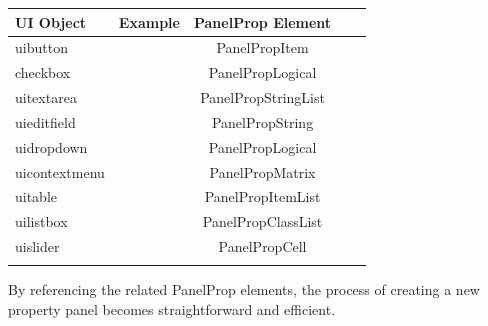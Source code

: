 \documentclass{tufte-handout}
\begin{document}
\begin{table}\sffamily
	\begin{tabular}{l*4{C}@{}}
		\toprule
		UI Object & Example & PanelProp Element \\ 
		\midrule
		uibutton & \addpicbutton & PanelPropItem \\ 
		checkbox & \addpiccheckbox & PanelPropLogical \\ 
		uitextarea  & \addpictextarea & PanelPropStringList \\
		uieditfield & \addpiceditfield & PanelPropString \\
		uidropdown & \addpicdropdown & PanelPropLogical \\
		uicontextmenu & \addpiccontextmenu & PanelPropMatrix \\
		uitable & \addpictable & PanelPropItemList \\
		uilistbox & \addpiclistbox & PanelPropClassList \\
		uislider & \addpicslider & PanelPropCell \\
		\bottomrule \\
	\end{tabular}
\end{table} 
By referencing the related PanelProp elements, the process of creating a new property panel becomes straightforward and efficient.


%
%
\end{document}
